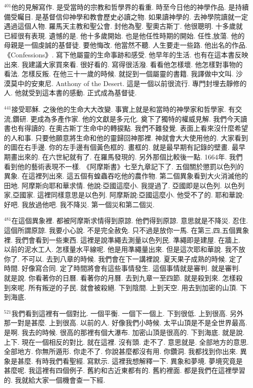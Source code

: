 \documentclass{book}
\begin{document}
$^{401}$他的見解寫作.
是受當時的宗教和哲學界的看重.
時至今日他的神學作品.
是持續備受矚目.
是基督信仰神學和教會歷史必讀之物.
如果讀神學的.
去神學院讀就一定遇過這個人物.
羅馬天主教和聖公會.
封他為聖.
聖奧古斯丁.
他很聰明.
十多歲就已經很有表現.
遺憾的是.
他十多歲開始.
也是他任性時期的開始.
任性,放蕩.
他的母親是一個虔誠的基督徒.
要他悔改.
他當然不聽.
人生要走一些路.
他出名的作品.
《Confessions》.
寫下他屬靈的生命事跡和感受.
他早年的生活.
也有在這本書反映出來.
我建議大家買來看.
很好看的.
寫得很活潑.
看看他怎樣壞.
他怎樣對事物的看法.
怎樣反叛.
在他三十一歲的時候.
就捉到一個屬靈的書籍.
我譯做中文叫.
沙漠莫中的安東尼.
Anthony of the Desert.
這是一個以前很流行.
專門封埋去靜修的人.
他就受到這本書的感動.
正式成為基督徒.

$^{441}$接受耶穌.
之後他的生命大大改變.
事實上就是和當時的神學家和哲學家.
有交流,鑽研.
更成為多產作家.
他的文獻是多元化.
奠下了獨特的權威見解.
我們今天讀書也有得讀的.
在奧古斯丁生命中的轉捩點.
我們不難發覺.
表面上看來沒什麼希望的人和事.
只要他願意將生命和他的靈歸回神那裡.
神就會大大使用他的.
大家看到的圖在右手邊.
你的左手邊有個黃色框的.
畫框的.
就是最早期有記錄的壁畫.
最早期畫出來的.
在六世紀就有了.
在羅馬發現的.
另外那個比較後一點.
1664年.
我們看到他的藝術表現不一樣.
《阿摩斯書》七至九章記下了.
五個關於懲罰以色列的異象.
在這裡列出來.
這五個有蝗蟲吞吃他的農作物.
第二個異象看到大火消滅他的田地.
阿摩斯向耶和華求情.
他說:亞國這麼小.
我提過了.
亞國即是以色列.
以色列家,亞國家.
這裡同樣意思是以色列.
阿摩斯說:亞國這麼小.
他受不了的.
耶和華說:好吧.
我放過他吧.
我不降災.
第一個災和第二個災.

$^{481}$在這個異象裡.
都被阿摩斯求情得到原諒.
他們得到原諒.
意思就是不降災.
忍住.
這個所謂原諒.
我要小心說.
不是完全赦免.
只不過是放你一馬.
在第三,四,五個異象裡.
我們會看到一些東西.
這裡是說準繩去測量以色列民.
準繩即是建屋.
在牆上.
以前的泥水工人.
怎樣量水平線呢.
他是用準繩量出來.
但是這次耶和華說.
我不放你了.
不可以.
去到八章的時候.
我們會在下一講裡說.
夏天果子成熟的時候.
定了時間.
好像寫合同.
定了時間將會有這些事情發生.
這個事情就是審判.
就是審判.
就是說.
你看著你的日曆.
看著你的月曆.
去到九章一至四節.
就是殺到來.
怎樣殺到來呢.
所有叛逆的子民.
就會被殺絕.
下到陰間.
上到天空.
用去到加密的山頂.
下到海底.

$^{521}$我們看到這裡有一個對比.
一個平衡.
一個下一個上.
下到很低.
上到很高.
另外那一對是甚麼.
上到很高.
以前的人.
好像我們小時候.
太平山頂是不是全世界最高.
是啊.
我去的時候.
很高的那裡有個大瀑布.
加密山頂是很高的.
下到海底.
就是說.
上下.
現在一個相反的對比.
就在這裡.
沒有頭.
走不了.
意思就是.
全部地方的意思.
全部地方.
你無所遁形.
你走不了.
你說甚麼都沒有用.
你鑽洞.
我都找到你出來.
異象是甚麼.
有時我們看聖經.
寫默示.
這裡我想解釋一下.
異象和夢境.
夢境究竟是甚麼呢.
我這裡有四個例子.
舊約和古近東都有的.
舊約裡面.
都是我們在這裡學習的.
我就給大家一個機會查一下經.
\end{document}
